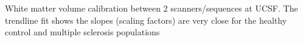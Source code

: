 \label{fig:hcms_WMV} White matter volume calibration between 2 scanners/sequences at UCSF. The trendline fit shows the slopes (scaling factors) are very close for the healthy control and multiple sclerosis populations